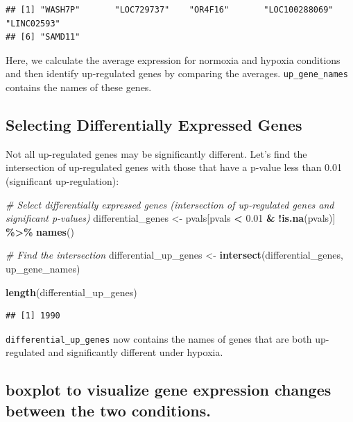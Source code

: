 \documentclass[
]{book}
\newenvironment{Shaded}{\begin{snugshade}}{\end{snugshade}}
\newcommand{\CommentTok}[1]{\textcolor[rgb]{0.56,0.35,0.01}{\textit{#1}}}
\newcommand{\FloatTok}[1]{\textcolor[rgb]{0.00,0.00,0.81}{#1}}
\newcommand{\FunctionTok}[1]{\textcolor[rgb]{0.13,0.29,0.53}{\textbf{#1}}}
\newcommand{\NormalTok}[1]{#1}
\newcommand{\OtherTok}[1]{\textcolor[rgb]{0.56,0.35,0.01}{#1}}
\newcommand{\SpecialCharTok}[1]{\textcolor[rgb]{0.81,0.36,0.00}{\textbf{#1}}}
\begin{document}
\begin{verbatim}
## [1] "WASH7P"       "LOC729737"    "OR4F16"       "LOC100288069" "LINC02593"   
## [6] "SAMD11"
\end{verbatim}

Here, we calculate the average expression for normoxia and hypoxia conditions and then identify up-regulated genes by comparing the averages. \texttt{up\_gene\_names} contains the names of these genes.

\hypertarget{selecting-differentially-expressed-genes}{%
\subsection{Selecting Differentially Expressed Genes}\label{selecting-differentially-expressed-genes}}

Not all up-regulated genes may be significantly different. Let's find the intersection of up-regulated genes with those that have a p-value less than 0.01 (significant up-regulation):

\begin{Shaded}
\begin{Highlighting}[]
\CommentTok{\# Select differentially expressed genes (intersection of up{-}regulated genes and significant p{-}values)}
\NormalTok{differential\_genes }\OtherTok{\textless{}{-}}\NormalTok{ pvals[pvals }\SpecialCharTok{\textless{}} \FloatTok{0.01} \SpecialCharTok{\&} \SpecialCharTok{!}\FunctionTok{is.na}\NormalTok{(pvals)] }\SpecialCharTok{\%\textgreater{}\%}
  \FunctionTok{names}\NormalTok{()}

\CommentTok{\# Find the intersection}
\NormalTok{differential\_up\_genes }\OtherTok{\textless{}{-}} \FunctionTok{intersect}\NormalTok{(differential\_genes, up\_gene\_names)}

\FunctionTok{length}\NormalTok{(differential\_up\_genes)}
\end{Highlighting}
\end{Shaded}

\begin{verbatim}
## [1] 1990
\end{verbatim}

\texttt{differential\_up\_genes} now contains the names of genes that are both up-regulated and significantly different under hypoxia.

\hypertarget{boxplot-to-visualize-gene-expression-changes-between-the-two-conditions.}{%
\subsection{boxplot to visualize gene expression changes between the two conditions.}\label{boxplot-to-visualize-gene-expression-changes-between-the-two-conditions.}}
\end{document}
